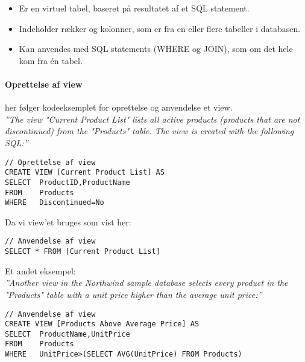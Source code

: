 \begin{itemize}
	\item Er en virtuel tabel, baseret på resultatet af et SQL statement.
	\item Indeholder rækker og kolonner, som er fra en eller flere tabeller i databasen.
	\item Kan anvendes med SQL statements (WHERE og JOIN), som om det hele kom fra én tabel.
\end{itemize}

\paragraph{Oprettelse af view} her følger kodeeksemplet for oprettelse og anvendelse et view. \\

\textit{''The view "Current Product List" lists all active products (products that are not discontinued) from the "Products" table. The view is created with the following SQL:''}

\begin{lstlisting}[caption=Kodeeksempel for oprettelse af View.,label=code:view,morekeywords={CREATE, VIEW, AS, SELECT, FROM, WHERE}]
// Oprettelse af view
CREATE VIEW [Current Product List] AS
SELECT 	ProductID,ProductName
FROM 	Products
WHERE 	Discontinued=No
\end{lstlisting}

Da vi view'et bruges som vist her: 

\begin{lstlisting}[caption=Kodeeksempel for anvendelse af View.,label=code:view]
// Anvendelse af view
SELECT * FROM [Current Product List]
\end{lstlisting}

Et andet eksempel:\\

\textit{''Another view in the Northwind sample database selects every product in the "Products" table with a unit price higher than the average unit price:''}

\begin{lstlisting}[caption=Et andet kodeeksempel for anvendelse af View.,label=code:view]
// Anvendelse af view
CREATE VIEW [Products Above Average Price] AS
SELECT 	ProductName,UnitPrice
FROM 	Products
WHERE 	UnitPrice>(SELECT AVG(UnitPrice) FROM Products)
\end{lstlisting}

